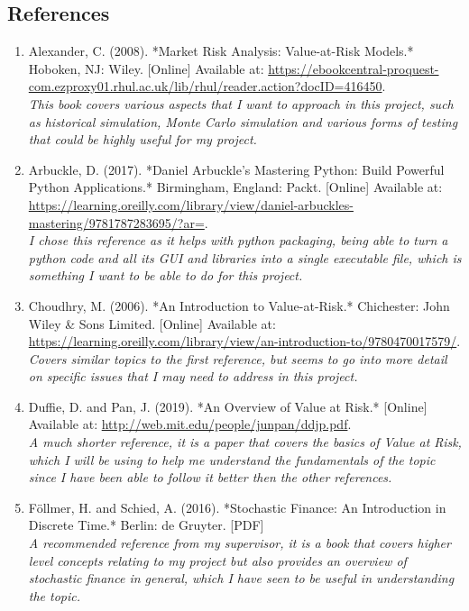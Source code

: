 \documentclass{article}
\begin{document}
\subsection{References}
\begin{small}
\begin{enumerate}
  \item\label{ref1} Alexander, C. (2008). *Market Risk Analysis: Value-at-Risk Models.* Hoboken, NJ: Wiley. [Online] Available at: \url{https://ebookcentral-proquest-com.ezproxy01.rhul.ac.uk/lib/rhul/reader.action?docID=416450}.
  \\\textit{This book covers various aspects that I want to approach in this project, such as historical simulation, Monte Carlo simulation and various forms of testing that could be highly useful for my project.}
  
  \item\label{ref2} Arbuckle, D. (2017). *Daniel Arbuckle’s Mastering Python: Build Powerful Python Applications.* Birmingham, England: Packt. [Online] Available at: \url{https://learning.oreilly.com/library/view/daniel-arbuckles-mastering/9781787283695/?ar=}.
  \\\textit{I chose this reference as it helps with python packaging, being able to turn a python code and all its GUI and libraries into a single executable file, which is something I want to be able to do for this project.}

  \item\label{ref3} Choudhry, M. (2006). *An Introduction to Value-at-Risk.* Chichester: John Wiley \& Sons Limited. [Online] Available at: \\ \url{https://learning.oreilly.com/library/view/an-introduction-to/9780470017579/}.
  \\\textit{Covers similar topics to the first reference, but seems to go into more detail on specific issues that I may need to address in this project.}
  
  \item\label{ref4} Duffie, D. and Pan, J. (2019). *An Overview of Value at Risk.* [Online] Available at: \url{http://web.mit.edu/people/junpan/ddjp.pdf}.
  \\\textit{A much shorter reference, it is a paper that covers the basics of Value at Risk, which I will be using to help me understand the fundamentals of the topic since I have been able to follow it better then the other references.}
  
  \item\label{ref5} Föllmer, H. and Schied, A. (2016). *Stochastic Finance: An Introduction in Discrete Time.* Berlin: de Gruyter. [PDF]
  \\\textit{A recommended reference from my supervisor, it is a book that covers higher level concepts relating to my project but also provides an overview of stochastic finance in general, which I have seen to be useful in understanding the topic.}
  

\end{enumerate}
\end{small}
\end{document}
